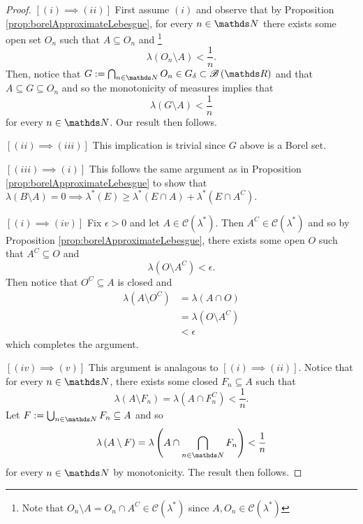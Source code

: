 \begin{proof}
$\left[\left(i\right)\implies\left(ii\right)\right]$ First assume
$\left(i\right)$ and observe that by Proposition \ref{prop:borelApproximateLebesgue},
for every $n\in\N$ there exists some open set $O_{n}$ such that
$A\subseteq O_{n}$ and \footnote{Note that $O_{n}\setminus A=O_{n}\cap A^{C}\in\mathcal{C}\left(\lambda^{*}\right)$
since $A,O_{n}\in\mathcal{C}\left(\lambda^{*}\right)$}
\[
\lambda\left(O_{n}\setminus A\right)<\frac{1}{n}.
\]
Then, notice that $G:=\bigcap_{n\in\N}O_{n}\in G_{\delta}\subset\borel\left(\R\right)$
and that $A\subseteq G\subseteq O_{n}$ and so the monotonicity of
measures implies that 
\[
\lambda\left(G\setminus A\right)<\frac{1}{n}
\]
for every $n\in\N$. Our result then follows.

$\left[\left(ii\right)\implies\left(iii\right)\right]$ This implication
is trivial since $G$ above is a Borel set.

$\left[\left(iii\right)\implies\left(i\right)\right]$ This follows
the same argument as in Proposition \ref{prop:borelApproximateLebesgue}
to show that $\lambda\left(B\setminus A\right)=0\implies\lambda^{*}\left(E\right)\geq\lambda^{*}\left(E\cap A\right)+\lambda^{*}\left(E\cap A^{C}\right).$

$\left[\left(i\right)\implies\left(iv\right)\right]$ Fix $\epsilon>0$
and let $A\in\mathcal{C}\left(\lambda^{*}\right)$. Then $A^{C}\in\mathcal{C}\left(\lambda^{*}\right)$
and so by Proposition \ref{prop:borelApproximateLebesgue},
there exists some open $O$ such that $A^{C}\subseteq O$ and 
\[
\lambda\left(O\setminus A^{C}\right)<\epsilon.
\]
Then notice that $O^{C}\subseteq A$ is closed and 
\begin{align*}
\lambda\left(A\setminus O^{C}\right) & =\lambda\left(A\cap O\right)\\
 & =\lambda\left(O\setminus A^{C}\right)\\
 & <\epsilon
\end{align*}
which completes the argument.

$\left[\left(iv\right)\implies\left(v\right)\right]$ This argument
is analagous to $\left[\left(i\right)\implies\left(ii\right)\right]$.
Notice that for every $n\in\N$, there exists some closed $F_{n}\subseteq A$
such that 
\[
\lambda\left(A\setminus F_{n}\right)=\lambda\left(A\cap F_{n}^{C}\right)<\frac{1}{n}.
\]
Let $F:=\bigcup_{n\in\N}F_{n}\subseteq A$ and so 
\[
\lambda\left(A\setminus F\right)=\lambda\left(A\cap\bigcap_{n\in\N}F_{n}\right)<\frac{1}{n}
\]
for every $n\in\N$ by monotonicity. The result then follows.


\end{proof}
